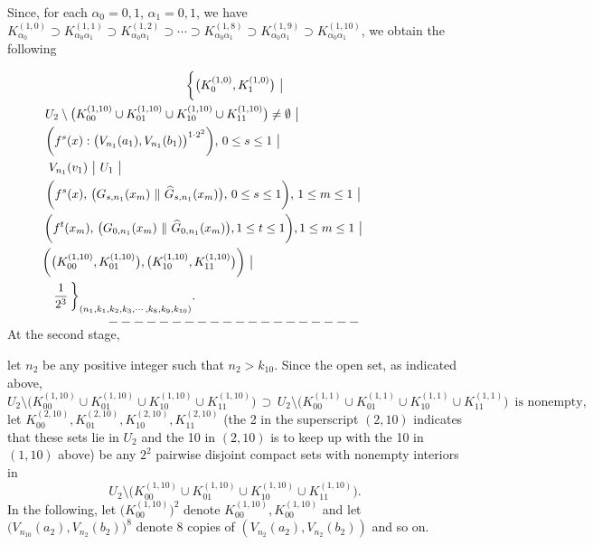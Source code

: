 \documentclass[12pt]{article}
\newcommand{\al}{\alpha}
\begin{document}
\indent Since, for each $\al_0 = 0, 1$, $\al_1 = 0, 1$, we have $K_{\al_0}^{(1,0)} \supset K_{\al_0\al_1}^{(1,1)} \supset K_{\al_0\al_1}^{(1,2)} \supset \cdots \supset K_{\al_0\al_1}^{(1,8)} \supset K_{\al_0\al_1}^{(1,9)} \supset K_{\al_0\al_1}^{(1,10)}$, we obtain the following 

\begin{multline*}
$$
\bigg\{ \big(K_0^{(1,0)}, K_1^{(1,0)}\big) \,\, \big| \\
\,\, U_2 \setminus \big(K_{00}^{(1,10)} \cup K_{01}^{(1,10)} \cup K_{10}^{(1,10)} \cup K_{11}^{(1,10)} \big) \ne \emptyset \,\, \big| \qquad\qquad\qquad\qquad\qquad\,\,\,\, \\ 
\, \bigg(f^s(x):\big(V_{n_1}(a_1), V_{n_1}(b_1)\big)^{1 \cdot 2^2}\bigg), \, 0 \le s \le 1 \,\, \big| \qquad\qquad\qquad\qquad\qquad\qquad \\
\, V_{n_1}(v_1) \,\, \big| \,\, U_1 \,\, \big|  \qquad\qquad\qquad\qquad\qquad\qquad\qquad\qquad\qquad\qquad\qquad\quad\quad\,\,\,\,\, \\
\quad \bigg(f^{s}(x), \, \big(G_{s,n_1}(x_m) \,\, \| \,\, \widehat G_{s,n_1}(x_m)\big), \, 0 \le s \le 1\bigg), \, 1 \le m \le 1 \,\, \big| \qquad\qquad\quad\quad\, \\ 
\qquad\quad \bigg(f^t(x_m), \, \big(G_{0,n_1}(x_m) \,\, \| \,\, \widehat G_{0,n_1}(x_m)\big), 1 \le t \le 1\bigg), 1 \le m \le 1 \,\, \big| \qquad\qquad\qquad\qquad\, \\ 
\bigg(\big(K_{00}^{(1,10)}, K_{01}^{(1,10)}\big), \big(K_{10}^{(1,10)}, K_{11}^{(1,10)}\big)\bigg) \,\, \big| \qquad\qquad\qquad\qquad\qquad\qquad\quad\quad\,\, \\
\,\, \frac 1{2^3}  \, \bigg\}_{(n_1, k_1, k_2, k_3, \cdots, k_8, k_9, k_{10})}. \qquad\qquad\qquad\qquad\qquad\qquad\qquad\qquad\qquad\,\,\,
$$
\end{multline*}
$$--------------------$$ 
\indent At the second stage, 

let $n_2$ be any positive integer such that $n_2 > k_{10}$.  Since the open set, as indicated above,
$$
U_2 \setminus \big(K_{00}^{(1,10)} \cup K_{01}^{(1,10)} \cup K_{10}^{(1,10)} \cup K_{11}^{(1,10)}\big) \, \supset \, U_2 \setminus \big(K_{00}^{(1,1)} \cup K_{01}^{(1,1)} \cup K_{10}^{(1,1)} \cup K_{11}^{(1,1)}\big)\,\,\, \text{is nonempty},
$$
let $K_{00}^{(2,10)}, K_{01}^{(2,10)}, K_{10}^{(2,10)}, K_{11}^{(2,10)}$ \big(the 2 in the superscript $(2, 10)$ indicates that these sets lie in $U_2$ and the 10 in $(2, 10)$ is to keep up with the 10 in $(1, 10)$ above\big) be any $2^2$ pairwise disjoint compact sets with nonempty interiors in 
$$
U_2 \setminus \big( K_{00}^{(1,10)} \cup K_{01}^{(1,10)} \cup K_{10}^{(1,10)} \cup K_{11}^{(1,10)}\big).
$$
\indent In the following, let $\big(K_{00}^{(1,10)}\big)^2$ denote $K_{00}^{(1,10)}, K_{00}^{(1,10)}$ and let $\big(V_{n_10}(a_2), V_{n_2}(b_2)\big)^8$ denote 8 copies of $(V_{n_2}(a_2), V_{n_2}(b_2))$ and so on.  
\end{document}
